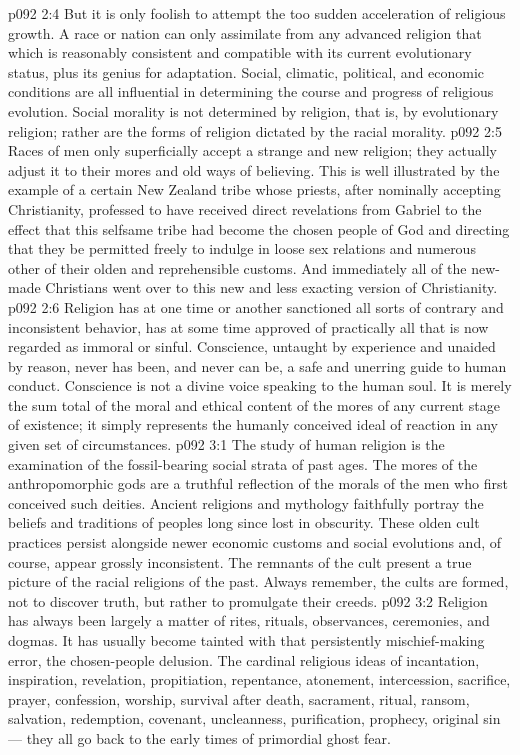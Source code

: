 \vs p092 2:4 But it is only foolish to attempt the too sudden acceleration of religious growth. A race or nation can only assimilate from any advanced religion that which is reasonably consistent and compatible with its current evolutionary status, plus its genius for adaptation. Social, climatic, political, and economic conditions are all influential in determining the course and progress of religious evolution. Social morality is not determined by religion, that is, by evolutionary religion; rather are the forms of religion dictated by the racial morality.
\vs p092 2:5 Races of men only superficially accept a strange and new religion; they actually adjust it to their mores and old ways of believing. This is well illustrated by the example of a certain New Zealand tribe whose priests, after nominally accepting Christianity, professed to have received direct revelations from Gabriel to the effect that this selfsame tribe had become the chosen people of God and directing that they be permitted freely to indulge in loose sex relations and numerous other of their olden and reprehensible customs. And immediately all of the new\hyp{}made Christians went over to this new and less exacting version of Christianity.
\vs p092 2:6 Religion has at one time or another sanctioned all sorts of contrary and inconsistent behavior, has at some time approved of practically all that is now regarded as immoral or sinful. Conscience, untaught by experience and unaided by reason, never has been, and never can be, a safe and unerring guide to human conduct. Conscience is not a divine voice speaking to the human soul. It is merely the sum total of the moral and ethical content of the mores of any current stage of existence; it simply represents the humanly conceived ideal of reaction in any given set of circumstances.
\vs p092 3:1 The study of human religion is the examination of the fossil\hyp{}bearing social strata of past ages. The mores of the anthropomorphic gods are a truthful reflection of the morals of the men who first conceived such deities. Ancient religions and mythology faithfully portray the beliefs and traditions of peoples long since lost in obscurity. These olden cult practices persist alongside newer economic customs and social evolutions and, of course, appear grossly inconsistent. The remnants of the cult present a true picture of the racial religions of the past. Always remember, the cults are formed, not to discover truth, but rather to promulgate their creeds.
\vs p092 3:2 Religion has always been largely a matter of rites, rituals, observances, ceremonies, and dogmas. It has usually become tainted with that persistently mischief\hyp{}making error, the chosen\hyp{}people delusion. The cardinal religious ideas of incantation, inspiration, revelation, propitiation, repentance, atonement, intercession, sacrifice, prayer, confession, worship, survival after death, sacrament, ritual, ransom, salvation, redemption, covenant, uncleanness, purification, prophecy, original sin --- they all go back to the early times of primordial ghost fear.

